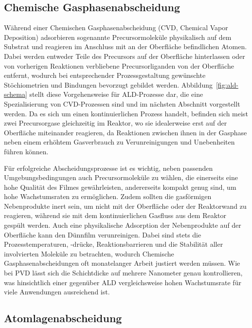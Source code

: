 \subsection{Chemische Gasphasenabscheidung}

Während einer Chemischen Gasphasenabscheidung (CVD, Chemical Vapor Deposition) adsorbieren sogenannte Precursormoleküle physikalisch auf dem Substrat und reagieren im Anschluss mit an der Oberfläche befindlichen Atomen.
Dabei werden entweder Teile des Precursors auf der Oberfläche hinterlassen oder von vorherigen Reaktionen verbliebene Precursorliganden von der Oberfläche entfernt, wodurch bei entsprechender Prozessgestaltung gewünschte Stöchiometrien und Bindungen bevorzugt gebildet werden.
Abbildung~\ref{fig:ald-schema} stellt diese Vorgehensweise für ALD-Prozesse dar, die eine Spezialisierung von CVD-Prozessen sind und im nächsten Abschnitt vorgestellt werden.
Da es sich um einen kontinuierlichen Prozess handelt, befinden sich meist zwei Precursorgase gleichzeitig im Reaktor, wo sie idealerweise erst auf der Oberfläche miteinander reagieren, da Reaktionen zwischen ihnen in der Gasphase neben einem erhöhtem Gasverbrauch zu Verunreinigungen und Unebenheiten führen können.

Für erfolgreiche Abscheidungsprozesse ist es wichtig, neben passenden Umgebungsbedingungen auch Precursormoleküle zu wählen, die einerseits eine hohe Qualität des Filmes gewährleisten, andererseits kompakt genug sind, um hohe Wachstumsraten zu ermöglichen.
Zudem sollten die gasförmigen Nebenprodukte inert sein, um nicht mit der Oberfläche oder der Reaktorwand zu reagieren, während sie mit dem kontinuierlichen Gasfluss aus dem Reaktor gespült werden.
Auch eine physikalische Adsorption der Nebenprodukte auf der Oberfläche kann den Dünnfilm verunreinigen.
Dabei sind stets die Prozesstemperaturen, -drücke, Reaktionsbarrieren und die Stabilität aller involvierten Moleküle zu betrachten, wodurch Chemische Gasphasenabscheidungen oft monatelanger Arbeit justiert werden müssen.
Wie bei PVD lässt sich die Schichtdicke auf mehrere Nanometer genau kontrollieren, was hinsichtlich einer gegenüber ALD vergleichsweise hohen Wachstumsrate für viele Anwendungen ausreichend ist.


\subsection{Atomlagenabscheidung}

